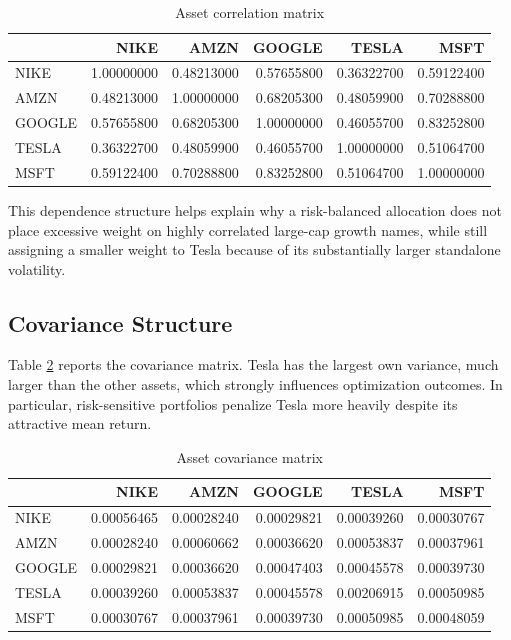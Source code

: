 \documentclass[wcp]{jmlr}
\begin{document}
\begin{abstract - TEST}
\begin{table}[H]
\centering
\caption{Asset correlation matrix}
\label{tab:corr_matrix}
\small
\begin{tabular}{lrrrrr}
\toprule
 & NIKE & AMZN & GOOGLE & TESLA & MSFT \\
\midrule
NIKE   & 1.00000000 & 0.48213000 & 0.57655800 & 0.36322700 & 0.59122400 \\
AMZN   & 0.48213000 & 1.00000000 & 0.68205300 & 0.48059900 & 0.70288800 \\
GOOGLE & 0.57655800 & 0.68205300 & 1.00000000 & 0.46055700 & 0.83252800 \\
TESLA  & 0.36322700 & 0.48059900 & 0.46055700 & 1.00000000 & 0.51064700 \\
MSFT   & 0.59122400 & 0.70288800 & 0.83252800 & 0.51064700 & 1.00000000 \\
\bottomrule
\end{tabular}
\end{table}

This dependence structure helps explain why a risk-balanced allocation does not place excessive weight on highly correlated large-cap growth names, while still assigning a smaller weight to Tesla because of its substantially larger standalone volatility.

\subsection{Covariance Structure}

Table \ref{tab:cov_matrix} reports the covariance matrix. Tesla has the largest own variance, much larger than the other assets, which strongly influences optimization outcomes. In particular, risk-sensitive portfolios penalize Tesla more heavily despite its attractive mean return.

\begin{table}[H]
\centering
\caption{Asset covariance matrix}
\label{tab:cov_matrix}
\small
\begin{tabular}{lrrrrr}
\toprule
 & NIKE & AMZN & GOOGLE & TESLA & MSFT \\
\midrule
NIKE   & 0.00056465 & 0.00028240 & 0.00029821 & 0.00039260 & 0.00030767 \\
AMZN   & 0.00028240 & 0.00060662 & 0.00036620 & 0.00053837 & 0.00037961 \\
GOOGLE & 0.00029821 & 0.00036620 & 0.00047403 & 0.00045578 & 0.00039730 \\
TESLA  & 0.00039260 & 0.00053837 & 0.00045578 & 0.00206915 & 0.00050985 \\
MSFT   & 0.00030767 & 0.00037961 & 0.00039730 & 0.00050985 & 0.00048059 \\
\bottomrule
\end{tabular}
\end{table}


\end{abstract - TEST}
\end{document}
